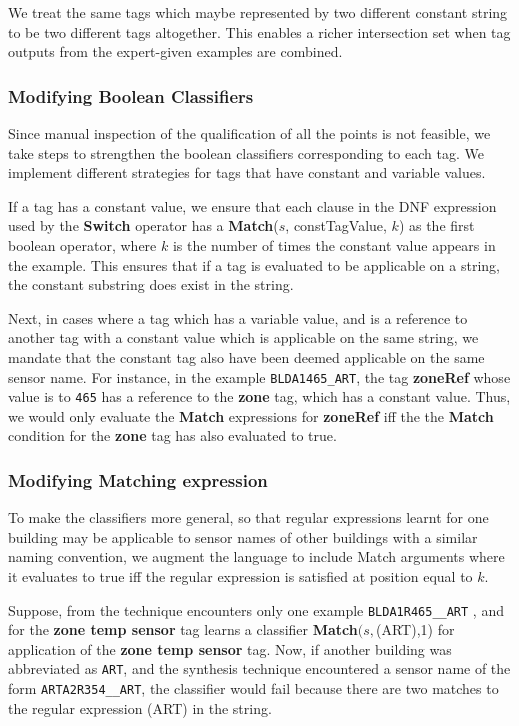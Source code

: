 We treat the same tags which maybe represented by two different constant string to be two different tags altogether. This enables a richer intersection set when tag outputs from the expert-given examples are combined. 

\subsubsection{Modifying Boolean Classifiers}

Since manual inspection of the qualification of all the points is not feasible, we take steps to strengthen the boolean classifiers corresponding to each tag. We implement different strategies for tags that have constant and variable values.

If a tag has a constant value, we ensure that each clause in the DNF expression used by the {\bf Switch} operator has a {\bf Match}($s$, constTagValue, $k$) as the first boolean operator, where $k$ is the number of times the constant value appears in the example. This ensures that if a tag is evaluated to be applicable on a string, the constant substring does exist in the string.

Next, in cases where a tag which has a variable value, and is a reference to another tag with a constant value which is applicable on the same string, we mandate that the constant tag also have been deemed applicable on the same sensor name. For instance, in the example \texttt{BLDA1465\_ART}, the tag {\bf zoneRef} whose value is to \texttt{465} has a reference to the {\bf zone} tag, which has a constant value. Thus, we would only evaluate the {\bf Match} expressions for {\bf zoneRef} iff the the {\bf Match} condition for the {\bf zone} tag has also evaluated to true. 




\subsubsection{Modifying Matching expression}

To make the classifiers more general, so that regular expressions learnt for one building may be applicable to sensor names of other buildings with a similar naming convention, we augment the language to include Match arguments where it evaluates to true iff the regular expression is satisfied at position equal to $k$. 

Suppose, from the technique encounters only one example \texttt{BLDA1R465\_\_ART} , and for the {\bf zone temp sensor} tag learns a classifier  {\bf Match}$(s,$(ART),1) for application of the {\bf zone temp sensor} tag. Now, if another building was abbreviated as \texttt{ART}, and the synthesis technique encountered a sensor name of the form \texttt{ARTA2R354\_\_ART}, the classifier would fail because there are two matches to the regular expression (ART) in the string. 

